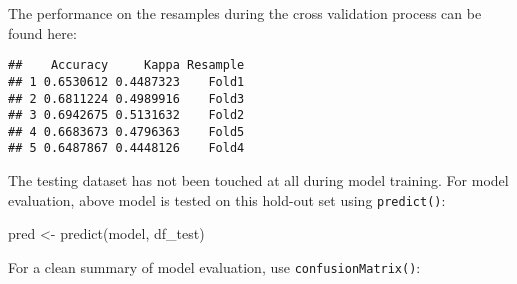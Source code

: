 \documentclass[
]{book}
\newenvironment{Shaded}{\begin{snugshade}}{\end{snugshade}}
\newcommand{\AttributeTok}[1]{\textcolor[rgb]{0.77,0.63,0.00}{#1}}
\newcommand{\FunctionTok}[1]{\textcolor[rgb]{0.00,0.00,0.00}{#1}}
\newcommand{\NormalTok}[1]{#1}
\newcommand{\OtherTok}[1]{\textcolor[rgb]{0.56,0.35,0.01}{#1}}
\newcommand{\SpecialCharTok}[1]{\textcolor[rgb]{0.00,0.00,0.00}{#1}}
\newcommand{\StringTok}[1]{\textcolor[rgb]{0.31,0.60,0.02}{#1}}
\begin{document}
The performance on the resamples during the cross validation process can be found here:

\begin{Shaded}
\end{Shaded}

\begin{verbatim}
##    Accuracy     Kappa Resample
## 1 0.6530612 0.4487323    Fold1
## 2 0.6811224 0.4989916    Fold3
## 3 0.6942675 0.5131632    Fold2
## 4 0.6683673 0.4796363    Fold5
## 5 0.6487867 0.4448126    Fold4
\end{verbatim}

The testing dataset has not been touched at all during model training. For model evaluation, above model is tested on this hold-out set using \texttt{predict()}:

\begin{Shaded}
\begin{Highlighting}[]
\NormalTok{pred }\OtherTok{\textless{}{-}} \FunctionTok{predict}\NormalTok{(model, df\_test)}
\end{Highlighting}
\end{Shaded}

For a clean summary of model evaluation, use \texttt{confusionMatrix()}:

\begin{Shaded}
\end{Shaded}
\end{document}
